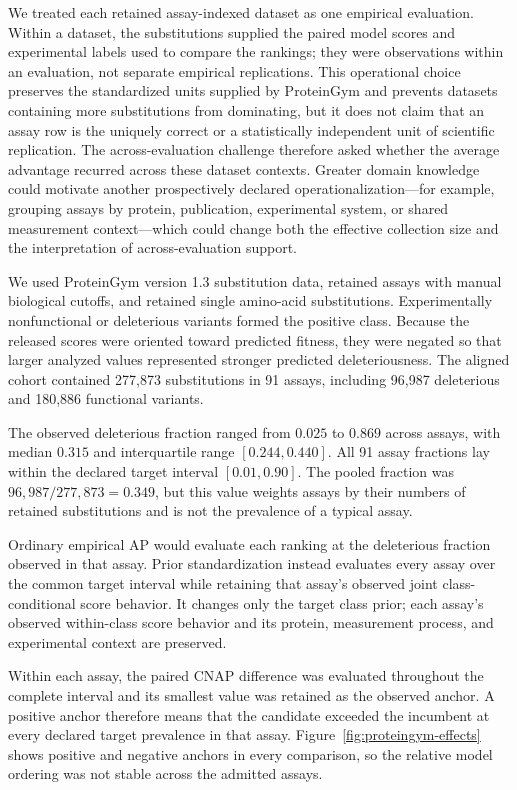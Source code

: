 \documentclass[11pt]{article}
\theoremstyle{remark}
\begin{document}
We treated each retained assay-indexed dataset as one empirical evaluation.
Within a dataset, the substitutions supplied the paired model scores and
experimental labels used to compare the rankings; they were observations
within an evaluation, not separate empirical replications. This operational
choice preserves the standardized units supplied by ProteinGym and prevents
datasets containing more substitutions from dominating, but it does not claim
that an assay row is the uniquely correct or a statistically independent unit
of scientific replication. The across-evaluation challenge therefore asked
whether the average advantage recurred across these dataset contexts. Greater
domain knowledge could motivate another prospectively declared
operationalization---for example, grouping assays by protein, publication,
experimental system, or shared measurement context---which could change both
the effective collection size and the interpretation of across-evaluation
support.

We used ProteinGym version 1.3 substitution data, retained assays with manual
biological cutoffs, and retained single amino-acid substitutions.
Experimentally nonfunctional or deleterious variants formed the positive class.
Because the released scores were oriented toward predicted fitness, they were
negated so that larger analyzed values represented stronger predicted
deleteriousness. The aligned cohort contained 277,873 substitutions in 91
assays, including 96,987 deleterious and 180,886 functional variants.

The observed deleterious fraction ranged from $0.025$ to $0.869$ across assays,
with median $0.315$ and interquartile range $[0.244,0.440]$. All 91 assay
fractions lay within the declared target interval $[0.01,0.90]$. The pooled
fraction was $96{,}987/277{,}873=0.349$, but this value weights assays by their
numbers of retained substitutions and is not the prevalence of a typical
assay.

Ordinary empirical AP would evaluate each ranking at the deleterious fraction
observed in that assay. Prior standardization instead evaluates every assay
over the common target interval while retaining that assay's observed joint
class-conditional score behavior. It changes only the target class prior; each assay's observed within-class
score behavior and its protein, measurement process, and experimental context
are preserved.

Within each assay, the paired CNAP difference was evaluated throughout the
complete interval and its smallest value was retained as the observed anchor.
A positive anchor therefore means that the candidate exceeded the incumbent at
every declared target prevalence in that assay. Figure~\ref{fig:proteingym-effects}
shows positive and negative anchors in every comparison, so the relative model
ordering was not stable across the admitted assays.
\end{document}
